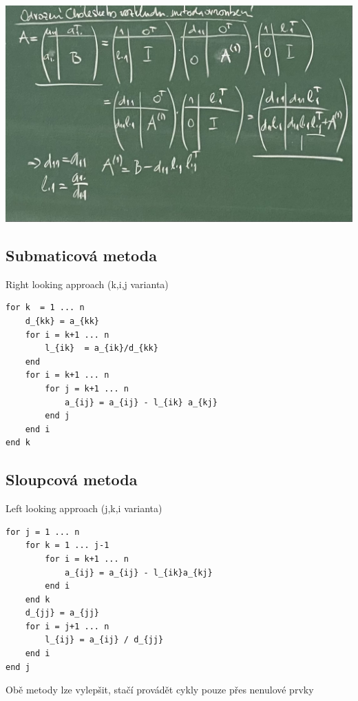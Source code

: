 \documentclass[../main.tex]{subfiles}
\begin{document}
\begin{center}
    \includegraphics[width=0.9\linewidth]{images/12-10-odvozeni.jpg}
\end{center}




\subsection{Submaticová metoda}
Right looking approach (k,i,j varianta)

\begin{minipage}{0.95\linewidth}
\begin{verbatim}
for k  = 1 ... n 
    d_{kk} = a_{kk}
    for i = k+1 ... n
        l_{ik}  = a_{ik}/d_{kk}
    end
    for i = k+1 ... n
        for j = k+1 ... n
            a_{ij} = a_{ij} - l_{ik} a_{kj}
        end j
    end i
end k
\end{verbatim}
\end{minipage}


\subsection{Sloupcová metoda}
Left looking approach (j,k,i varianta)

\begin{minipage}{0.95\linewidth}
\begin{verbatim}
for j = 1 ... n 
    for k = 1 ... j-1
        for i = k+1 ... n
            a_{ij} = a_{ij} - l_{ik}a_{kj}
        end i
    end k
    d_{jj} = a_{jj}
    for i = j+1 ... n
        l_{ij} = a_{ij} / d_{jj}
    end i 
end j
\end{verbatim}    
\end{minipage}


\begin{remark}
    Obě metody lze vylepšit, stačí provádět cykly pouze přes nenulové prvky
\end{remark}
\end{document}
